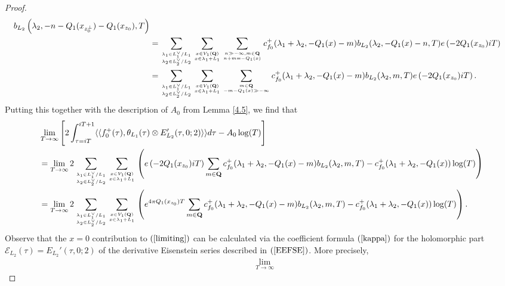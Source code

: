 \documentclass{amsart}
\theoremstyle{definition}
\begin{document}
\begin{proof}
\begin{equation}
\begin{aligned}
b_{L_2} \left( \lambda_2, -n-Q_1(x_{z_0^{\perp}}) - Q_1(x_{z_0}), T \right) \\
&=  \sum\limits_{ \lambda_1 \in L_1^{\vee} / L_1 \atop \lambda_2 \in L_2^{\vee}/L_2  } \sum\limits_{x \in V_1({\bf{Q}}) \atop x \in \lambda_1 + L_1} 
\sum\limits_{n \gg - \infty, m \in {\bf{Q}} \atop n + m = -Q_1(x)} c_{f_0}^+(\lambda_1+ \lambda_2, -Q_1(x) - m) 
b_{L_2}(\lambda_2, -Q_1(x) - n, T) e \left( - 2Q_1(x_{z_0}) iT \right) \\
&= \sum\limits_{ \lambda_1 \in L_1^{\vee} / L_1 \atop \lambda_2 \in L_2^{\vee}/L_2  } \sum\limits_{x \in V_1({\bf{Q}}) \atop x \in \lambda_1 + L_1} 
\sum\limits_{m \in {\bf{Q}} \atop -m -Q_1(x) \gg - \infty} c_{f_0}^+(\lambda_1+ \lambda_2, -Q_1(x) - m) 
b_{L_2}(\lambda_2, m, T) e \left( - 2Q_1(x_{z_0}) iT \right). \end{aligned}\end{equation} 
Putting this together with the description of $A_0$ from Lemma \ref{4.5}, we find that 
\begin{equation}\begin{aligned}\label{limiting}& \lim_{T \rightarrow \infty} 
\left[ 2 \int_{\tau = i T}^{iT +1} \langle \langle f_0^+(\tau), \theta_{L_1}(\tau) \otimes E^{\prime}_{L_2}(\tau, 0; 2)\rangle \rangle d \tau -  A_0 \log(T) \right] \\ 
&=  \lim_{T \rightarrow \infty} 2 \sum\limits_{ \lambda_1 \in L_1^{\vee} / L_1 \atop \lambda_2 \in L_2^{\vee}/L_2  } \sum\limits_{x \in V_1({\bf{Q}}) \atop x \in \lambda_1 + L_1} 
\left( e \left( -2Q_1(x_{z_0}) iT \right) \sum\limits_{m \in {\bf{Q}} } c_{f_0}^+(\lambda_1+ \lambda_2, -Q_1(x) - m) b_{L_2}(\lambda_2, m, T)  -   c_{f_0}^+(\lambda_1 + \lambda_2, -Q_1(x))  \log(T)    \right)  \\
&=  \lim_{T \rightarrow \infty} 
2 \sum\limits_{ \lambda_1 \in L_1^{\vee} / L_1 \atop \lambda_2 \in L_2^{\vee}/L_2  } \sum\limits_{x \in V_1({\bf{Q}}) \atop x \in \lambda_1 + L_1} 
\left( e^{4 \pi Q_1(x_{z_0}) T} \sum\limits_{m \in {\bf{Q}} } c_{f_0}^+(\lambda_1+ \lambda_2, -Q_1(x) - m) b_{L_2}(\lambda_2, m, T)  -   c_{f_0}^+(\lambda_1 + \lambda_2, -Q_1(x))  \log(T)    \right).\end{aligned}\end{equation}
Observe that the $x=0$ contribution to $(\ref{limiting})$ can be calculated via the coefficient formula $(\ref{kappa})$ for the holomorphic 
part $\mathcal{E}_{L_2}(\tau) = E_{L_2}'(\tau,0; 2)$ of the derivative Eisenstein series described in $(\ref{EEFSE})$. More precisely,  
\begin{align*} &\lim_{T \rightarrow \infty} 

\end{align*}
\end{proof}
\end{document}

